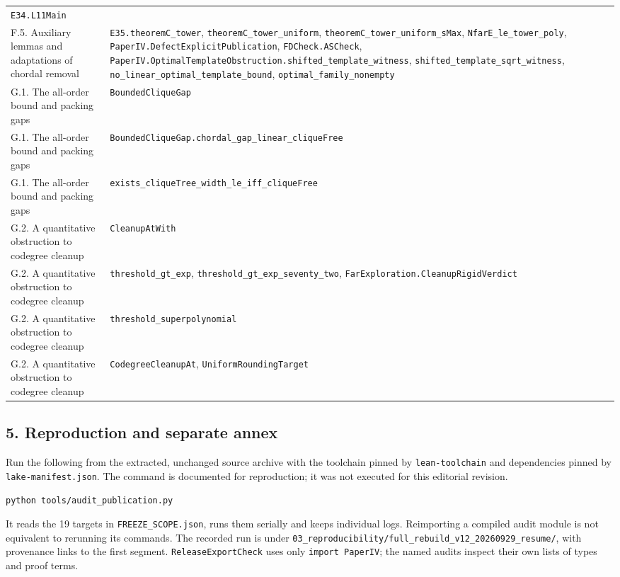 \documentclass[english,11pt,a4paper]{article}
\newcounter{none}
\begin{document}
{\begin{longtable}[]{@{}
  >{\raggedright\arraybackslash}p{}
  >{\raggedright\arraybackslash}p{}@{}}
\nolinkurl{E34.L11Main} \\
F.5. Auxiliary lemmas and adaptations of chordal removal &
\nolinkurl{E35.theoremC_tower}, \nolinkurl{theoremC_tower_uniform},
\nolinkurl{theoremC_tower_uniform_sMax},
\nolinkurl{NfarE_le_tower_poly},
\nolinkurl{PaperIV.DefectExplicitPublication}, \nolinkurl{FDCheck.ASCheck},
\nolinkurl{PaperIV.OptimalTemplateObstruction.shifted_template_witness},
\nolinkurl{shifted_template_sqrt_witness},
\nolinkurl{no_linear_optimal_template_bound},
\nolinkurl{optimal_family_nonempty} \\
G.1. The all-order bound and packing gaps & \nolinkurl{BoundedCliqueGap} \\
G.1. The all-order bound and packing gaps &
\nolinkurl{BoundedCliqueGap.chordal_gap_linear_cliqueFree} \\
G.1. The all-order bound and packing gaps &
\nolinkurl{exists_cliqueTree_width_le_iff_cliqueFree} \\
G.2. A quantitative obstruction to codegree cleanup &
\nolinkurl{CleanupAtWith} \\
G.2. A quantitative obstruction to codegree cleanup &
\nolinkurl{threshold_gt_exp}, \nolinkurl{threshold_gt_exp_seventy_two},
\nolinkurl{FarExploration.CleanupRigidVerdict} \\
G.2. A quantitative obstruction to codegree cleanup &
\nolinkurl{threshold_superpolynomial} \\
G.2. A quantitative obstruction to codegree cleanup &
\nolinkurl{CodegreeCleanupAt}, \nolinkurl{UniformRoundingTarget} \\
\end{longtable}
}

\subsection{5. Reproduction and separate
annex}\label{reproduction-and-separate-annex}

Run the following from the extracted, unchanged source archive with the
toolchain pinned by \nolinkurl{lean-toolchain} and dependencies pinned by
\nolinkurl{lake-manifest.json}. The command is documented for reproduction;
it was not executed for this editorial revision.

\begin{verbatim}
python tools/audit_publication.py
\end{verbatim}

It reads the 19 targets in \nolinkurl{FREEZE_SCOPE.json}, runs them
serially and keeps individual logs. Reimporting a compiled audit module
is not equivalent to rerunning its commands. The recorded run is under
\nolinkurl{03_reproducibility/full_rebuild_v12_20260929_resume/}, with
provenance links to the first segment. \nolinkurl{ReleaseExportCheck} uses
only \texttt{import\ PaperIV}; the named audits inspect their own lists
of types and proof terms.
\end{document}
